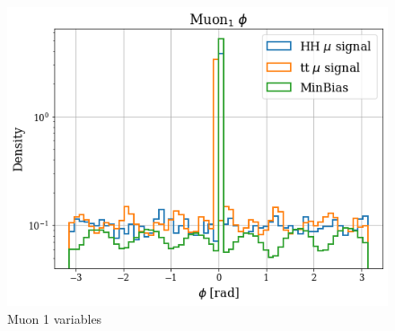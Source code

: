 \documentclass[../main.tex]{subfiles}
\begin{document}
\begin{figure}[h]
\begin{minipage}[b]{0.33\linewidth}
    \centering
    \includegraphics[width=1\linewidth]{Chapters/Plots/Hist_1mu_muon1_Phi.png}
  \end{minipage}
  \caption{Muon 1 variables}
\end{figure}
\end{document}
